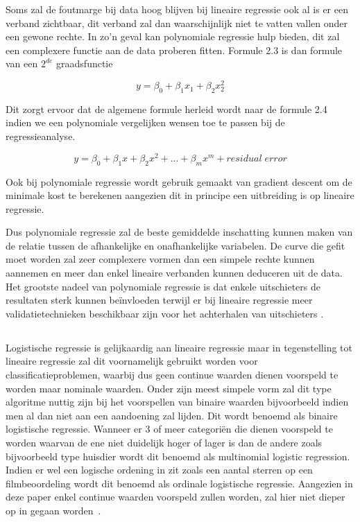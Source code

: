 Soms zal de foutmarge bij data hoog blijven bij lineaire regressie ook al is er een verband zichtbaar, dit verband zal dan waarschijnlijk niet te vatten vallen onder een gewone rechte. In zo'n geval kan polynomiale regressie hulp bieden, dit zal een complexere functie aan de data proberen fitten. Formule 2.3 is dan formule van een $2^{de}$ graadsfunctie 

\begin{equation}
y = \beta_0 + \beta_1 x_1  + \beta_2 x_2^2 
\end{equation}

Dit zorgt ervoor dat de algemene formule herleid wordt naar de formule 2.4 indien we een polynomiale vergelijken wensen toe te passen bij de regressieanalyse.

\begin{equation}
y = \beta_0 + \beta_1 x  + \beta_2 x^2 + ... + \beta_m x^m + residual\;error
\end{equation}

Ook bij polynomiale regressie wordt gebruik gemaakt van gradient descent om de minimale kost te berekenen aangezien dit in principe een uitbreiding is op lineaire regressie. 

Dus polynomiale regressie zal de beste gemiddelde inschatting kunnen maken van de relatie tussen de afhankelijke en onafhankelijke variabelen. De curve die gefit moet worden zal zeer complexere vormen dan een simpele rechte kunnen aannemen en meer dan enkel lineaire verbanden kunnen deduceren uit de data. Het grootste nadeel van polynomiale regressie is dat enkele uitschieters de resultaten sterk kunnen be\"{i}nvloeden terwijl er bij lineaire regressie meer validatietechnieken beschikbaar zijn voor het achterhalen van uitschieters \autocite{Pant2019}. 



\subsection{}

Logistische regressie is gelijkaardig aan lineaire regressie maar in tegenstelling tot lineaire regressie zal dit voornamelijk gebruikt worden voor classificatieproblemen, waarbij dus geen continue waarden dienen voorspeld te worden maar nominale waarden. Onder zijn meest simpele vorm zal dit type algoritme nuttig zijn bij het voorspellen van binaire waarden bijvoorbeeld indien men al dan niet aan een aandoening zal lijden. Dit wordt benoemd als binaire logistische regressie. Wanneer er 3 of meer categori\"{e}n die dienen voorspeld te worden waarvan de ene niet duidelijk hoger of lager is dan de andere zoals bijvoorbeeld type huisdier wordt dit benoemd als multinomial logistic regression. Indien er wel een logische ordening in zit zoals een aantal sterren op een filmbeoordeling wordt dit benoemd als ordinale logistische regressie.
Aangezien in deze paper enkel continue waarden voorspeld zullen worden, zal hier niet dieper op in gegaan worden~\autocite{Swaminathan2018}.

